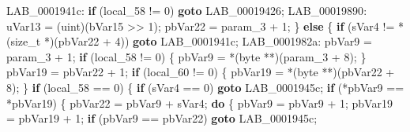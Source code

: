 \documentclass[
]{article}
\newenvironment{Shaded}{}{}
\newcommand{\ControlFlowTok}[1]{\textcolor[rgb]{0.00,0.44,0.13}{\textbf{#1}}}
\newcommand{\DataTypeTok}[1]{\textcolor[rgb]{0.56,0.13,0.00}{#1}}
\newcommand{\DecValTok}[1]{\textcolor[rgb]{0.25,0.63,0.44}{#1}}
\newcommand{\NormalTok}[1]{#1}
\newcommand{\OperatorTok}[1]{\textcolor[rgb]{0.40,0.40,0.40}{#1}}
\begin{document}
\begin{Shaded}
\begin{Highlighting}[]
\NormalTok{LAB\_0001941c}\OperatorTok{:}
    \ControlFlowTok{if} \OperatorTok{(}\NormalTok{local\_58 }\OperatorTok{!=} \DecValTok{0}\OperatorTok{)} \ControlFlowTok{goto}\NormalTok{ LAB\_00019426}\OperatorTok{;}
\NormalTok{LAB\_00019890}\OperatorTok{:}
\NormalTok{    uVar13 }\OperatorTok{=} \OperatorTok{(}\NormalTok{uint}\OperatorTok{)(}\NormalTok{bVar15 }\OperatorTok{\textgreater{}\textgreater{}} \DecValTok{1}\OperatorTok{);}
\NormalTok{    pbVar22 }\OperatorTok{=}\NormalTok{ param\_3 }\OperatorTok{+} \DecValTok{1}\OperatorTok{;}
  \OperatorTok{\}}
  \ControlFlowTok{else} \OperatorTok{\{}
    \ControlFlowTok{if} \OperatorTok{(}\NormalTok{sVar4 }\OperatorTok{!=} \OperatorTok{*(}\DataTypeTok{size\_t} \OperatorTok{*)(}\NormalTok{pbVar22 }\OperatorTok{+} \DecValTok{4}\OperatorTok{))} \ControlFlowTok{goto}\NormalTok{ LAB\_0001941c}\OperatorTok{;}
\NormalTok{LAB\_0001982a}\OperatorTok{:}
\NormalTok{    pbVar9 }\OperatorTok{=}\NormalTok{ param\_3 }\OperatorTok{+} \DecValTok{1}\OperatorTok{;}
    \ControlFlowTok{if} \OperatorTok{(}\NormalTok{local\_58 }\OperatorTok{!=} \DecValTok{0}\OperatorTok{)} \OperatorTok{\{}
\NormalTok{      pbVar9 }\OperatorTok{=} \OperatorTok{*(}\NormalTok{byte }\OperatorTok{**)(}\NormalTok{param\_3 }\OperatorTok{+} \DecValTok{8}\OperatorTok{);}
    \OperatorTok{\}}
\NormalTok{    pbVar19 }\OperatorTok{=}\NormalTok{ pbVar22 }\OperatorTok{+} \DecValTok{1}\OperatorTok{;}
    \ControlFlowTok{if} \OperatorTok{(}\NormalTok{local\_60 }\OperatorTok{!=} \DecValTok{0}\OperatorTok{)} \OperatorTok{\{}
\NormalTok{      pbVar19 }\OperatorTok{=} \OperatorTok{*(}\NormalTok{byte }\OperatorTok{**)(}\NormalTok{pbVar22 }\OperatorTok{+} \DecValTok{8}\OperatorTok{);}
    \OperatorTok{\}}
    \ControlFlowTok{if} \OperatorTok{(}\NormalTok{local\_58 }\OperatorTok{==} \DecValTok{0}\OperatorTok{)} \OperatorTok{\{}
      \ControlFlowTok{if} \OperatorTok{(}\NormalTok{sVar4 }\OperatorTok{==} \DecValTok{0}\OperatorTok{)} \ControlFlowTok{goto}\NormalTok{ LAB\_0001945c}\OperatorTok{;}
      \ControlFlowTok{if} \OperatorTok{(*}\NormalTok{pbVar9 }\OperatorTok{==} \OperatorTok{*}\NormalTok{pbVar19}\OperatorTok{)} \OperatorTok{\{}
\NormalTok{        pbVar22 }\OperatorTok{=}\NormalTok{ pbVar9 }\OperatorTok{+}\NormalTok{ sVar4}\OperatorTok{;}
        \ControlFlowTok{do} \OperatorTok{\{}
\NormalTok{          pbVar9 }\OperatorTok{=}\NormalTok{ pbVar9 }\OperatorTok{+} \DecValTok{1}\OperatorTok{;}
\NormalTok{          pbVar19 }\OperatorTok{=}\NormalTok{ pbVar19 }\OperatorTok{+} \DecValTok{1}\OperatorTok{;}
          \ControlFlowTok{if} \OperatorTok{(}\NormalTok{pbVar9 }\OperatorTok{==}\NormalTok{ pbVar22}\OperatorTok{)} \ControlFlowTok{goto}\NormalTok{ LAB\_0001945c}\OperatorTok{;}

\end{Highlighting}
\end{Shaded}
\end{document}

